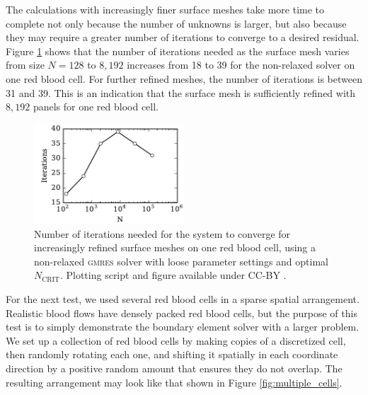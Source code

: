 \documentclass[final,3p,times]{elsarticle}
\newcommand{\ncrit}{N_{\text{CRIT}}}
\newcommand{\gmres}{\textsc{gmres}\xspace}
\begin{document}
The calculations with increasingly finer surface meshes take more time to complete not only because the number of unknowns is larger, but also because they may require a greater number of iterations to converge to a desired residual.
Figure \ref{fig:single_cell_iterations} shows that the number of iterations needed as the surface mesh varies from size $N=128$ to $8,192$ increases from 18 to 39 for the non-relaxed solver on one red blood cell. For further refined meshes, the number of iterations is between 31 and 39. This is an indication that the surface mesh is sufficiently refined with $8,192$ panels for one red blood cell.

\begin{figure}
\begin{center}
	\includegraphics[natwidth=3in,natheight=2in,width=0.5\textwidth]{EthrocyteSingleCellIterations.pdf}
	\caption{Number of iterations needed for the system to converge for increasingly refined surface meshes on one red blood cell, using a non-relaxed \gmres solver with loose parameter settings and optimal $\ncrit$. Plotting script and figure available under CC-BY \cite{WangLaytonBarba2016-figshare4}.}
	\label{fig:single_cell_iterations}
\end{center}
\end{figure}


For the next test, we used several red blood cells in a sparse spatial arrangement. Realistic blood flows have densely packed red blood cells, but the purpose of this test is to simply demonstrate the boundary element solver with a larger problem. We set up a collection of red blood cells by making copies of a discretized cell, then randomly rotating each one, and shifting it spatially in each  coordinate direction by a positive random amount that ensures they do not overlap. The resulting arrangement may look like that shown in Figure \ref{fig:multiple_cells}.
\end{document}
